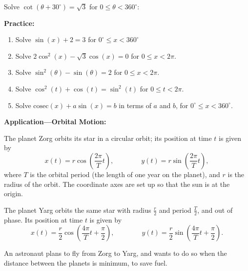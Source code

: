 \documentclass{article}
\newcommand{\cosec}{\mathrm{cosec}}
\begin{document}
\vfill


Solve $\cot(\theta+30^\circ)=\sqrt{3}$ for $0\leq \theta<360^\circ$:

\vfill



\clearpage






\textbf{Practice:}

\vspace{5mm}

\begin{enumerate}
\item Solve $\sin(x)+2=3$ for $0^\circ \leq x < 360^\circ$
\item Solve $2\cos^2(x)-\sqrt{3}\cos(x)=0$ for $0\leq x<2\pi$.
\item Solve $\sin^2(\theta)-\sin(\theta)=2$ for $0\leq x<2\pi$.
\item Solve $\cos^2(t)+\cos(t)=\sin^2(t)$ for $0\leq t<2\pi$.
\item Solve $\cosec(x)+a\sin(x)=b$ in terms of $a$ and $b$, for $0^\circ\leq x<360^\circ$.
\end{enumerate}






\clearpage

\textbf{Application---Orbital Motion:}

\vspace{5mm}


The planet Zorg orbits its star in a circular orbit; its position at time $t$ is given by
\[x(t)=r\cos\left(\frac{2\pi}{T}t\right),\qquad\qquad y(t)=r\sin\left(\frac{2\pi}{T}t\right),\]
where $T$ is the orbital period (the length of one year on the planet), and $r$ is the radius of the orbit. The coordinate axes are set up so that the sun is at the origin.

The planet Yarg orbits the same star with radius $\frac{r}{2}$ and period $\frac{T}{2}$, and out of phase. Its position at time $t$ is given by
\[x(t)=\frac{r}{2}\cos\left(\frac{4\pi}{T}t+\frac{\pi}{2}\right),\qquad\qquad y(t)=\frac{r}{2}\sin\left(\frac{4\pi}{T}t+\frac{\pi}{2}\right).\]


An astronaut plans to fly from Zorg to Yarg, and wants to do so when the distance between the planets is minimum, to save fuel.
\end{document}
